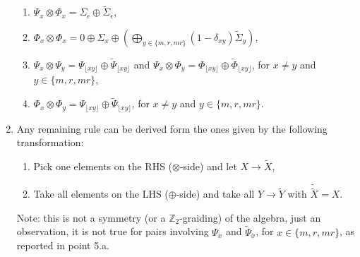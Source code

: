 \documentclass[two column]{article}
\begin{document}
\begin{enumerate}
\begin{enumerate}
		\item $\Psi_x \otimes \Phi_x = \Sigma_\epsilon \oplus \tilde\Sigma_\epsilon$,
		\item $\Phi_x \otimes \Phi_x = 0 \oplus \Sigma_x \oplus (\bigoplus_{y \in \{m, r, mr\}}(1-\delta_{xy})\tilde\Sigma_y)$,
		\item $\Psi_x \otimes \Psi_y = \Psi_{\lfloor xy \rfloor} \oplus \tilde\Psi_{\lfloor xy \rfloor}$ and $\Psi_x \otimes \Phi_y = \Phi_{\lfloor xy \rfloor} \oplus \tilde\Phi_{\lfloor xy \rfloor}$, for $x \neq y$ and $y \in \{m, r, mr\}$,
		\item $\Phi_x \otimes \Phi_y  = \Psi_{\lfloor xy \rfloor} \oplus \tilde\Psi_{\lfloor xy \rfloor}$, for $x \neq y$ and $y \in \{m, r, mr\}$.
	\end{enumerate}
	\item Any remaining rule can be derived form the ones given by the following transformation:\begin{enumerate}
		\item Pick one elements on the RHS ($\otimes$-side) and let $X \rightarrow \tilde X$,
		\item Take all elements on the LHS ($\oplus$-side) and take all $Y \rightarrow \tilde Y$ with $\tilde{\tilde{X}} = X$.
	\end{enumerate}
	Note: this is not a symmetry (or a $\mathbb{Z}_2$-graiding) of the algebra, just an observation, it is not true for pairs involving $\Psi_x$ and $\tilde\Psi_x$, for $x \in \{m, r, mr\}$, as reported in point 5.a.
\end{enumerate}
\end{document}
